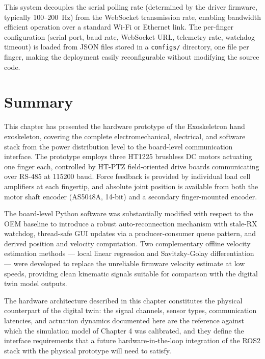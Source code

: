 This system decouples the serial polling rate (determined by the driver firmware, typically 100--200~Hz) from the WebSocket transmission rate, enabling bandwidth efficient operation over a standard Wi-Fi or Ethernet link. The per-finger configuration (serial port, baud rate, WebSocket URL, telemetry rate, watchdog timeout) is loaded from JSON files stored in a \texttt{configs/} directory, one file per finger, making the deployment easily reconfigurable without modifying the source code.

\section{Summary}
This chapter has presented the hardware prototype of the Exoskeletron hand exoskeleton, covering the complete electromechanical, electrical, and software stack from the power distribution level to the board-level communication interface. The prototype employs three HT1225 brushless DC motors actuating one finger each, controlled by HT-PTZ field-oriented drive boards communicating over RS-485 at 115200 baud. Force feedback is provided by individual load cell amplifiers at each fingertip, and absolute joint position is available from both the motor shaft encoder (AS5048A, 14-bit) and a secondary finger-mounted encoder.

The board-level Python software was substantially modified with respect to the OEM baseline to introduce a robust auto-reconnection mechanism with stale-RX watchdog, thread-safe GUI updates via a producer-consumer queue pattern, and derived position and velocity computation. Two complementary offline velocity estimation methods — local linear regression and Savitzky-Golay differentiation — were developed to replace the unreliable firmware velocity estimate at low speeds, providing clean kinematic signals suitable for comparison with the digital twin model outputs.

The hardware architecture described in this chapter constitutes the physical counterpart of the digital twin: the signal channels, sensor types, communication latencies, and actuation dynamics documented here are the reference against which the simulation model of Chapter 4 was calibrated, and they define the interface requirements that a future hardware-in-the-loop integration of the ROS2 stack with the physical prototype will need to satisfy.










